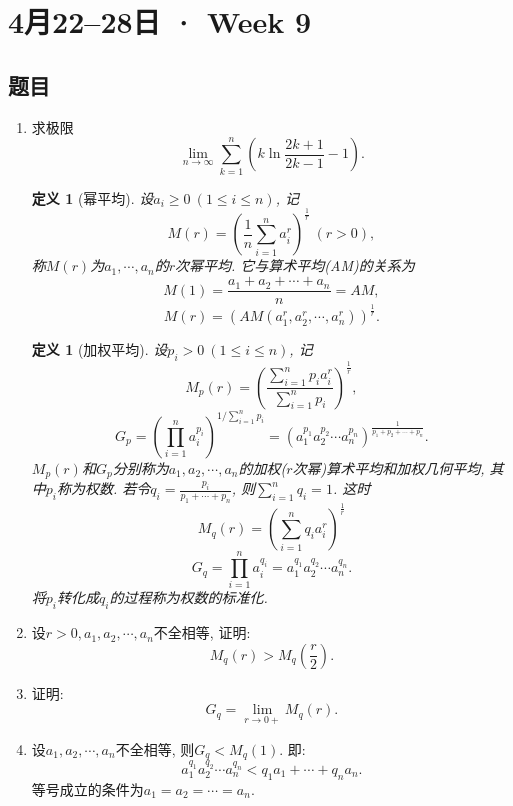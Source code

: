 \documentclass[UTF8,11pt, a4paper, oneside, fontset=none]{ctexbook}
\newtheorem{definition}[theorem]{定义}
\begin{document}
\clearpage

\section{4月22--28日 · Week 9}

\subsection*{题目}

\begin{enumerate}
\item 求极限
\[
\lim_{n \to \infty} \sum_{k = 1}^n \left( k \ln \frac{2k+1}{2k-1} -1 \right).
\]

\begin{definition}[幂平均]
设$a_i \geq 0 \ (1 \leq i \leq n)$, 记
\[
M(r) = \left( \frac{1}{n} \sum_{i=1}^n a_i^r \right)^{\frac{1}{r}} \ (r > 0),
\]
称$M(r)$为$a_1, \cdots, a_n$的$r$次幂平均. 它与算术平均(AM)的关系为
\[
M(1) = \frac{a_1 + a_2 + \cdots + a_n}{n} = AM,
\]
\[
M(r) =( AM(a_1^r, a_2^r, \cdots, a_n^r))^{\frac{1}{r}}.
\]
\end{definition}

\begin{definition}[加权平均]
设$p_i > 0 \ (1 \leq i \leq n)$, 记
\[
M_p(r) = \left( \frac{ \sum_{i=1}^n p_i a_i^r }{\sum_{i=1}^n p_i} \right)^{\frac{1}{r}}, 
\]
\[
G_p = \left( \prod_{i=1}^n a_i^{p_i} \right)^{1 / \sum_{i=1}^n p_i} = (a_1^{p_1} a_2^{p_2} \cdots a_n^{p_n} )^{\frac{1}{p_1 + p_2 + \cdots + p_n}}.
\]
$M_p(r)$和$G_p$分别称为$a_1, a_2, \cdots, a_n$的加权($r$次幂)算术平均和加权几何平均, 其中$p_i$称为权数. 若令$q_i = \frac{p_i}{p_1 + \cdots + p_n}$, 则$\sum_{i=1}^n q_i =1$. 这时
\[
M_q(r) = \left( \sum_{i=1}^n q_i a_i^r \right)^{\frac{1}{r}}
\]
\[
G_q = \prod_{i=1}^n a_i^{q_i} = a_1^{q_1} a_2^{q_2} \cdots a_n^{q_n}. 
\]
将$p_i$转化成$q_i$的过程称为权数的标准化.

\end{definition}

\item 设$r > 0, a_1, a_2, \cdots, a_n$不全相等, 证明:
\[
M_q(r) > M_q\left(\frac{r}{2}\right).
\]

\item 证明:
\[
G_q = \lim_{r \to 0+} M_q(r).
\]

\item 设$a_1, a_2, \cdots, a_n$不全相等, 则$G_q < M_q(1)$. 即:
\[
a_1^{q_1} a_2^{q_2} \cdots a_n^{q_n} < q_1 a_1 + \cdots + q_n a_n.
\]
等号成立的条件为$a_1 = a_2 = \cdots = a_n$.


\end{enumerate}
\end{document}
